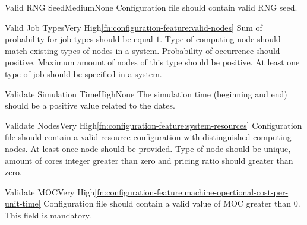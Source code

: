		
	\begin{functional}{Valid \gls{RNG} Seed}{Medium}{None}
		\label{fn:configuration-feature:valid-rng-seed}
		{
			Configuration file should contain valid \gls{RNG} seed.
		}
	\end{functional}
	
	\begin{functional}{Valid Job Types}{Very High}{\ref{fn:configuration-feature:valid-nodes}}
		\label{fn:configuration-feature:valid-job-types}
		{
			Sum of probability for job types should be equal $1$. Type of \gls{computing node} should match existing types of nodes in a system. Probability of occurrence should positive. Maximum amount of nodes of this type should be positive. At least one type of job should be specified in a system.
		}
	\end{functional}

	\begin{functional}{Validate Simulation Time}{High}{None}
		\label{fn:configuration-feature:validate-simulation-time}
		{
			The simulation time (beginning and end) should be a positive value related to the dates. 
		}
	\end{functional}

	\begin{functional}{Validate Nodes}{Very High}{\ref{fn:configuration-feature:system-resources}}
		\label{fn:configuration-feature:valid-nodes}
		{
			Configuration file should contain a valid resource configuration with distinguished \gls{computing node}s. At least once node should be provided. Type of node should be unique, amount of cores integer greater than zero and pricing ratio should greater than zero.  
		}
	\end{functional}

	\begin{functional}{Validate \gls{MOC}}{Very High}{\ref{fn:configuration-feature:machine-opertional-cost-per-unit-time}}
		\label{fn:configuration-feature:valid-moc}
		{
			Configuration file should contain a valid value of \gls{MOC} greater than $0$. This field is mandatory.
		}
	\end{functional}


